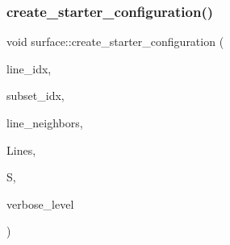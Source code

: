 \mbox{\label{classsurface_a4c5ed7de553c336243364e7ec045fffb}} 
\subsubsection{\texorpdfstring{create\+\_\+starter\+\_\+configuration()}{create\_starter\_configuration()}}
{\footnotesize\ttfamily void surface\+::create\+\_\+starter\+\_\+configuration (\begin{DoxyParamCaption}\item[{\mbox{\hyperlink{galois_8h_a09fddde158a3a20bd2dcadb609de11dc}{I\+NT}}}]{line\+\_\+idx,  }\item[{\mbox{\hyperlink{galois_8h_a09fddde158a3a20bd2dcadb609de11dc}{I\+NT}}}]{subset\+\_\+idx,  }\item[{\mbox{\hyperlink{classset__of__sets}{set\+\_\+of\+\_\+sets}} $\ast$}]{line\+\_\+neighbors,  }\item[{\mbox{\hyperlink{galois_8h_a09fddde158a3a20bd2dcadb609de11dc}{I\+NT}} $\ast$}]{Lines,  }\item[{\mbox{\hyperlink{galois_8h_a09fddde158a3a20bd2dcadb609de11dc}{I\+NT}} $\ast$}]{S,  }\item[{\mbox{\hyperlink{galois_8h_a09fddde158a3a20bd2dcadb609de11dc}{I\+NT}}}]{verbose\+\_\+level }\end{DoxyParamCaption})}

\mbox{\label{classsurface_a9e0834d9fd3ea14957df1944ac40c847}} 
